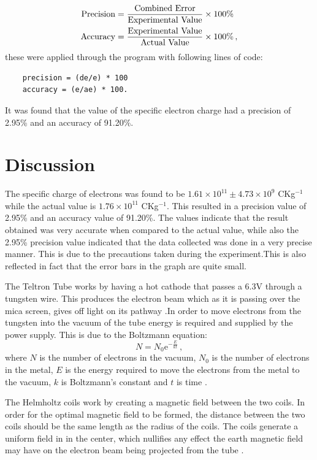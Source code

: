 \documentclass[12pt, a4paper]{article}
\begin{document}
\begin{align*}
    \text{Precision}&=\frac{\text{Combined Error}}{\text{Experimental Value}} \times 100\% \\
    \smallskip
    \text{Accuracy} &= \frac{\text{Experimental Value}}{\text{Actual Value}} \times 100\% \,,
\end{align*}
these were applied through the program with following lines of code:
\begin{lstlisting}
    precision = (de/e) * 100
    accuracy = (e/ae) * 100.
\end{lstlisting}
It was found that the value of the specific electron charge had a precision of 2.95\% and an accuracy of 91.20\%.

\section*{Discussion}
The specific charge of electrons was found to be $1.61\times10^{11}\pm4.73\times10^9$ CKg$^{-1}$ while the actual value is $1.76\times10^{11}$ CKg$^{-1}$. This resulted in a precision value of 2.95\% and an accuracy value of 91.20\%. The values indicate that the result obtained was very accurate when compared to the actual value, while also the 2.95\% precision value indicated that the data collected was done in a very precise manner. This is due to the precautions taken during the experiment.This is also reflected in fact that the error bars in the graph are quite small.
\smallskip

\noindent
The Teltron Tube works by having a hot cathode that passes a 6.3V through a tungsten wire. This produces the electron beam which as it is passing over the mica screen, gives off light on its pathway \parencite{Strawson_2009}.In order to move electrons from the tungsten into the vacuum of the tube energy is required and supplied by the power supply. This is due to the Boltzmann equation:
\begin{equation*}
    N = N_0 \text{e}^{-\frac{E}{kt}}\,,
\end{equation*}
where $N$ is the number of electrons in the vacuum, $N_0$ is the number of electrons in the metal, $E$ is the energy required to move the electrons from the metal to the vacuum, $k$ is Boltzmann's constant and $t$ is time \parencite{Strawson_2009}.
\smallskip

\noindent
The Helmholtz coils work by creating a magnetic field between the two coils. In order for the optimal magnetic field to be formed, the distance between the two coils should be the same length as the radius of the coils. The coils generate a uniform field in in the center, which nullifies any effect the earth magnetic field may have on the electron beam being projected from the tube \parencite{doi:10.1063/1.3474227}. 
\end{document}

